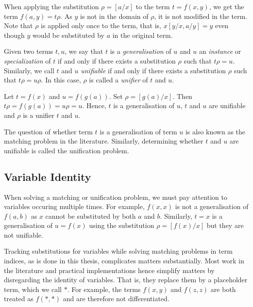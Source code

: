 When applying the substitution $\rho = [a/x]$ to the term $t = f(x,y)$, we get the term $f(a,y) = t \rho$. As $y$ is not in the domain of $\rho$, it is not modified in the term. Note that $\rho$ is applied only once to the term, that is, $x [y/x, a/y] = y$ even though $y$ would be substituted by $a$ in the original term.

\begin{defn}
Given two terms $t, u$, we say that $t$ is a \emph{generalisation} of $u$ and $u$ an \emph{instance} or \emph{specialization} of $t$ if and only if there exists a substitution $\rho$ such that $t \rho = u$. Similarly, we call $t$ and $u$ \emph{unifiable} if and only if there exists a substitution $\rho$ such that $t \rho = u \rho$. In this case, $\rho$ is called a \emph{unifier} of $t$ and $u$.
\end{defn}

\begin{exmpl}
  Let $t = f(x)$ and $u = f(g(a))$. Set $\rho = [g(a)/x]$. Then $t \rho = f(g(a)) = u \rho = u$. Hence, $t$ is a generalisation of $u$, $t$ and $u$ are unifiable and $\rho$ is a unifier $t$ and $u$.
\end{exmpl}

The question of whether term $t$ is a generalisation of term $u$ is also known as the matching problem in the literature. Similarly, determining whether $t$ and $u$ are unifiable is called the unification problem. \cite{mccune_experiments_1992}

\subsection{Variable Identity}\label{var_id}
When solving a matching or unification problem, we must pay attention to variables occuring multiple times. For example, $f(x,x)$ is not a generalisation of $f(a,b)$ as $x$ cannot be substituted by both $a$ and $b$. Similarly, $t = x$ is a generalisation of $u = f(x)$ using the substitution $\rho = [f(x)/x]$ but they are not unifiable.

Tracking substitutions for variables while solving matching problems in term indices, as is done in this thesis, complicates matters substantially.
Most work in the literature and practical implementations hence simplify matters by disregarding the identity of variables. That is, they replace them by a placeholder term, which we call $*$. For example, the terms $f(x,y)$ and $f(z,z)$ are both treated as $f(*,*)$ and are therefore not differentiated.

